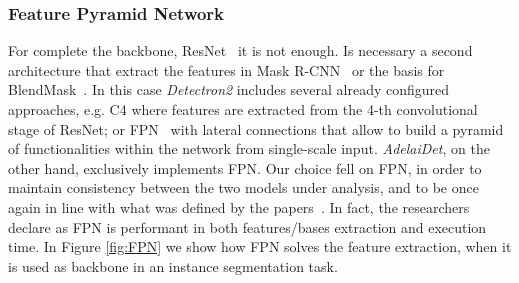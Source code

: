 \documentclass[10pt,twocolumn,letterpaper]{article}
\begin{document}
\subsubsection{Feature Pyramid Network}
For complete the backbone, ResNet~\cite{Authors5_ResNet} it is not enough. Is necessary a second architecture that extract the features in Mask R-CNN~\cite{Authors1_maskrcnn} or the basis for BlendMask~\cite{Authors2_BlendMask}. In this case \textit{Detectron2} includes several already configured approaches, e.g. C4 where features are extracted from the 4-th convolutional stage of ResNet; or FPN~\cite{FPN} with lateral connections that allow to build a pyramid of functionalities within the network from single-scale input. \textit{AdelaiDet}, on the other hand, exclusively implements FPN. Our choice fell on FPN, in order to maintain consistency between the two models under analysis, and to be once again in line with what was defined by the papers~\cite{Authors1_maskrcnn, Authors2_BlendMask}.  In fact, the researchers declare as FPN is performant in both features/bases extraction and execution time.  In Figure \ref{fig:FPN} we show how FPN solves the feature extraction, when it is used as backbone in an instance segmentation task.
\end{document}

